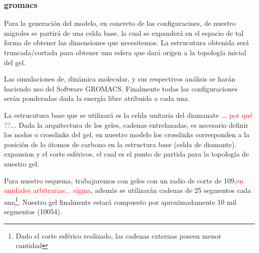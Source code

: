 \subsubsection{gromacs}
Para la generaci\'on del modelo, en concreto de las configuracines, de nuestro migroles se partir\'a de una celda base, la cual se expander\'a en el espacio de tal forma de obtener las dimensiones que necesitemos.
La estrucutura obtenida  ser\'a truncada/cortada para obtener una esfera que dará origen a la topología inicial del gel.

Las simulaciones de, din\'amica molecular, y sus respectivos an\'alisis se harán haciendo uso del Software GROMACS. \addcite[11] 
Finalmente todas las configuraciones serán  ponderadas dada la energía libre atribuida a cada una. \addcite[12]

La estrucutura base que se utilizar\'a es la celda unitaria del diamanate ...\textcolor{red}{ por qu\'e ??}...
Dada la arquitectura de los geles, cadenas entrelazadas, es necesario definir los nodos o crosslinks del gel,  en nuestro modelo los crosslinks corresponden a la posici\'on de lo \'atomos de carbono en la estructura base (celda de diamante).
expansion y el corte esféricos, el cual es el punto de partida para la topolog\'ia de nuestro gel.

Para nuestro esquema, trabajaremos con geles con un radio de corte de 109,\textcolor{red}{en unidades arbitrarias... sigma}, además se utilizarán cadenas de 25 segmentos cada una\footnote{Dado el corte esférico realizado, las cadenas externas poseen menor cantidad}. Nuestro gel finalmente estará compuesto por aproximadamente 10 mil segmentos (10054).
